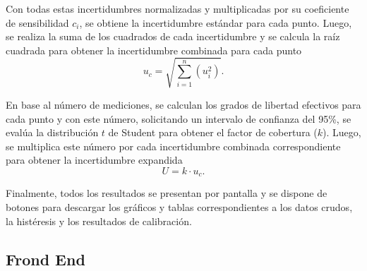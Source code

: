 Con todas estas incertidumbres normalizadas y multiplicadas por su coeficiente de sensibilidad $c_{i}$, se obtiene la incertidumbre estándar para cada punto. Luego, se realiza la suma de los cuadrados de cada incertidumbre y se calcula la raíz cuadrada para obtener la incertidumbre combinada para cada punto
\[
u_c = \sqrt{\sum_{i=1}^{n} (u_i^2)}.
\]

En base al número de mediciones, se calculan los grados de libertad efectivos para cada punto y con este número, solicitando un intervalo de confianza del 95\%, se evalúa la distribución $t$ de Student para obtener el factor de cobertura ($k$). Luego, se multiplica este número por cada incertidumbre combinada correspondiente para obtener la incertidumbre expandida 
\[
U = k \cdot u_c.
\]

Finalmente, todos los resultados se presentan por pantalla y se dispone de botones para descargar los gráficos y tablas correspondientes a los datos crudos, la histéresis y los resultados de calibración.


\subsection{Frond End}\label{sec:frondEnd}

